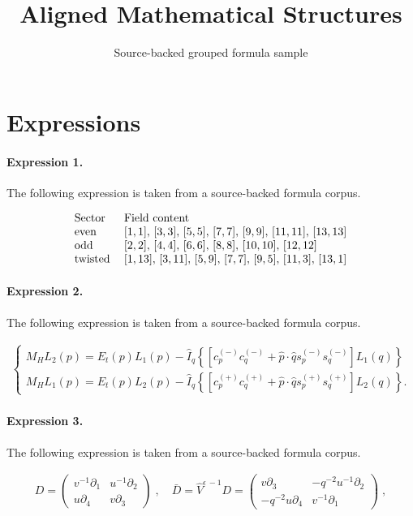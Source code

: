 \documentclass[11pt]{article}
\title{Aligned Mathematical Structures}
\author{Source-backed grouped formula sample}
\date{}
\begin{document}
\maketitle
\section{Expressions}
\paragraph{Expression 1.} The following expression is taken from a source-backed formula corpus.

\begin{align*}\begin{array}{ll}\hbox{Sector}\ \ &\hbox{Field content} \\\hbox{even} & [1,1],\, [3,3],\, [5,5],\, [7,7],\, [9,9],\, [11,11],\, [13,13] \\\hbox{odd} & [2,2],\, [4,4],\, [6,6],\, [8,8],\, [10,10],\, [12,12] \\\hbox{twisted} & [1,13],\, [3,11],\, [5,9],\, [7,7],\, [9,5],\, [11,3],\, [13,1] \\\end{array}\end{align*}

\paragraph{Expression 2.} The following expression is taken from a source-backed formula corpus.

\begin{align*}\left\{\begin{array}{c} M_{H}L_2(p) = E_t(p)L_1(p)-\hat{I}_q\left\{\left[c^{(-)}_pc_q^{(-)} +\hat{p}\cdot\hat{q}s_p^{(-)}s_q^{(-)}\right]L_1(q)\right\} \\ M_{H}L_1(p) = E_t(p)L_2(p)-\hat{I}_q\left\{\left[c^{(+)}_pc_q^{(+)} +\hat{p}\cdot\hat{q}s_p^{(+)}s_q^{(+)}\right]L_2(q)\right\}. \end{array}\right.\end{align*}

\paragraph{Expression 3.} The following expression is taken from a source-backed formula corpus.

\begin{align*}D = \left( \begin{array}{cc} v^{-1} \partial_1 & u^{-1} \partial_2 \\ u \partial_4 & v \partial_3 \end{array} \right) \; , \quad \bar{D} =\hat{V}^{\epsilon \, -1} D = \left( \begin{array}{cc} v \partial_3 & -q^{-2} u^{-1} \partial_2 \\ -q^{-2} u \partial_4 & v^{-1} \partial_1 \end{array} \right) \; ,\end{align*}
\end{document}
